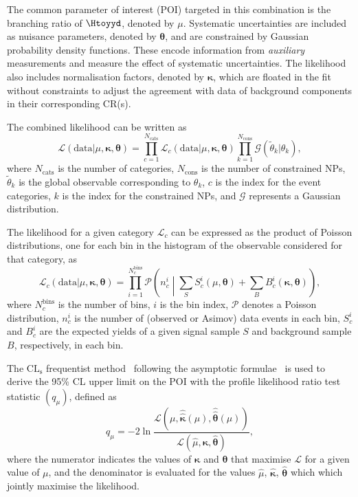 The common parameter of interest (POI) targeted in this combination is the branching ratio of $\Htoyyd$, denoted by $\mu$.
Systematic uncertainties are included as nuisance parameters, denoted by $\bm{\theta}$, and are constrained by Gaussian probability density functions.
These encode information from \textit{auxiliary} measurements and measure the effect of systematic uncertainties.
The likelihood also includes normalisation factors, denoted by $\bm{\kappa}$, which are floated in the fit without constraints to adjust the agreement with data of background components in their corresponding CR(s).

The combined likelihood can be written as~\cite{Cranmer:1456844}
\begin{equation}
    \mathcal{L}\left(\mathrm{data}\vert\mu,\bm{\kappa},\bm{\theta}\right) = \prod_{c=1}^{N_\mathrm{cats}}\mathcal{L}_c\left(\mathrm{data}\vert\mu,\bm{\kappa},\bm{\theta}\right)\prod_{k=1}^{N_\mathrm{cons}}\mathcal{G}\left(\tilde{\theta}_k\vert\theta_k\right),
    \label{eq:combined_likelihood}
\end{equation}
where $N_\mathrm{cats}$ is the number of categories, $N_\mathrm{cons}$ is the number of constrained NPs, $\tilde{\theta}_k$ is the global observable corresponding to $\theta_k$, $c$ is the index for the event categories, $k$ is the index for the constrained NPs, and $\mathcal{G}$ represents a Gaussian distribution.

The likelihood for a given category $\mathcal{L}_c$ can be expressed as the product of Poisson distributions, one for each bin in the histogram of the observable considered for that category, as
\begin{equation}
    \mathcal{L}_c\left(\mathrm{data}\vert\mu,\bm{\kappa},\bm{\theta}\right) = \prod_{i=1}^{N_c^\mathrm{bins}}\mathcal{P}\left(n^i_c\middle\vert\sum_{S} S^i_{c}(\mu,\bm{\theta}) + \sum_{B}B^i_{c}(\bm{\kappa},\bm{\theta}) \right),
    \label{eq:cat_likelihood}
\end{equation}
where $N^\mathrm{bins}_c$ is the number of bins, $i$ is the bin index, $\mathcal{P}$ denotes a Poisson distribution, $n^i_c$ is the number of (observed or Asimov) data events in each bin, $S^i_{c}$ and $B^i_{c}$ are the expected yields of a given signal sample $S$ and background sample $B$, respectively, in each bin.

The $\mathrm{CL_s}$ frequentist method~\cite{CLsmethod} following the asymptotic formulae~\cite{Cowan_2011} is used to derive the 95\% CL upper limit on the POI with the profile likelihood ratio test statistic $(q_\mu)$, defined as
\begin{equation}
    q_\mu = -2\ln\frac{\mathcal{L}\left(\mu,\hat{\hat{\bm{\kappa}}}(\mu), \hat{\hat{\bm{\theta}}}(\mu)\right)}{\mathcal{L}\left(\hat{\mu},{\hat{\bm{\kappa}}}, {\hat{\bm{\theta}}}\right)},
    \label{eq:qmu}
\end{equation}
where the numerator indicates the values of $\bm{\kappa}$ and $\bm{\theta}$ that maximise $\mathcal{L}$ for a given value of $\mu$, and the denominator is evaluated for the values $\hat{\mu}$, ${\hat{\bm{\kappa}}}$, ${\hat{\bm{\theta}}}$ which which jointly maximise the likelihood.

